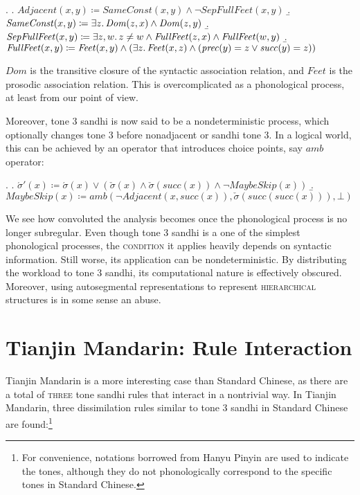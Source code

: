 \documentclass[12pt, a4paper]{report}
\newcommand{\textemph}[1]{\textsc{#1}}
\begin{document}
\ex.
\a. \(\mathit{Adjacent}(x, y) \coloneq \mathit{SameConst}(x, y) \land
\neg\mathit{SepFullFeet}(x, y)\)
\b. \(\mathit{SameConst}(x, y) \coloneq \exists z\ldotp
\mathit{Dom}(z, x) \land \mathit{Dom}(z, y)\)
\b. \(\mathit{SepFullFeet}(x, y) \coloneq \exists z, w\ldotp
z \neq w \land \mathit{FullFeet}(z, x) \land \mathit{FullFeet}(w, y)\)
\b. \(\mathit{FullFeet}(x, y) \coloneq \mathit{Feet}(x, y) \land
(\exists z\ldotp \mathit{Feet}(x, z) \land
(\mathit{prec}(y) = z \lor \mathit{succ}(y) = z))\)

\(\mathit{Dom}\) is the transitive closure of the syntactic
association relation, and \(\mathit{Feet}\) is the prosodic
association relation.  This is overcomplicated as a phonological
process, at least from our point of view.

Moreover, tone 3 sandhi is now said to be a nondeterministic process,
which optionally changes tone 3 before nonadjacent or sandhi tone 3.
In a logical world, this can be achieved by an operator that
introduces choice points, say  \(\mathit{amb}\)
operator:

\ex.
\a. \(\acute{\sigma}'(x) \coloneq \acute{\sigma}(x) \lor
(\check{\sigma}(x) \land \check{\sigma}(\mathit{succ}(x))
\land \neg\mathit{MaybeSkip}(x))\)
\b. \(\mathit{MaybeSkip}(x) \coloneq
\mathit{amb}(\neg\mathit{Adjacent}(x, \mathit{succ}(x)),
\check{\sigma}(\mathit{succ}(\mathit{succ}(x))), \bot)\)

We see how convoluted the analysis becomes once the phonological
process is no longer subregular.  Even though tone 3 sandhi is a one
of the simplest phonological processes, the \textemph{condition} it
applies heavily depends on syntactic information.  Still worse, its
application can be nondeterministic.  By distributing the workload to
tone 3 sandhi, its computational nature is effectively obscured.
Moreover, using autosegmental representations to represent
\textemph{hierarchical} structures is in some sense an abuse.

\section{Tianjin Mandarin: Rule Interaction}
Tianjin Mandarin is a more interesting case than Standard Chinese, as
there are a total of \textemph{three} tone sandhi rules that interact
in a nontrivial way.  In Tianjin Mandarin, three dissimilation rules
similar to tone 3 sandhi in Standard Chinese are found:\footnote{For
  convenience, notations borrowed from Hanyu Pinyin are used to
  indicate the tones, although they do not phonologically correspond
  to the specific tones in Standard Chinese.}
\end{document}
